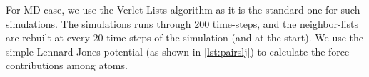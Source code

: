 \documentclass[preprint,12pt]{elsarticle}
\begin{document}

For \ac{MD} case, we use the Verlet Lists algorithm as it is the standard one for such simulations.
The simulations runs through 200 time-steps, and the neighbor-lists are rebuilt at every 20 time-steps of the simulation (and at the start).
We use the simple Lennard-Jones potential (as shown in \autoref{lst:pairslj}) to calculate the force contributions among atoms.

\end{document}
